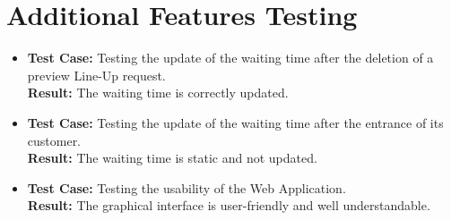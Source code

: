 \section{Additional Features Testing}

\begin{itemize}
	\item \textbf{Test Case:} Testing the update of the waiting time after the deletion of a preview Line-Up request.\\
	\textbf{Result:} The waiting time is correctly updated.

	\item \textbf{Test Case:} Testing the update of the waiting time after the entrance of its customer.\\
	\textbf{Result:} The waiting time is static and not updated.

	\item \textbf{Test Case:} Testing the usability of the Web Application.\\
	\textbf{Result:} The graphical interface is user-friendly and well understandable.

\end{itemize}
